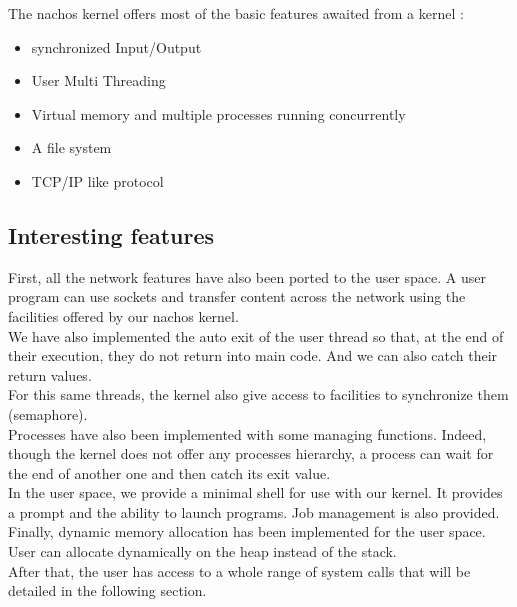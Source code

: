 The nachos kernel offers most of the basic features awaited from a kernel :\\
\begin{itemize}
\item synchronized Input/Output
\item User Multi Threading
\item Virtual memory and multiple processes running concurrently
\item A file system
\item TCP/IP like protocol
\end{itemize}

\subsection{Interesting features}

First, all the network features have also been ported to the user space. A user program can use sockets and 
transfer content across the network using the facilities offered by our nachos kernel. \\
We have also implemented the auto exit of the user thread so that, at the end of their execution, they do not return
into main code. And we can also catch their return values.\\
For this same threads, the kernel also give access to facilities to synchronize them (semaphore).\\
Processes have also been implemented with some managing functions. Indeed, though the kernel does not offer any 
processes hierarchy, a process can wait for the end of another one and then catch its exit value.\\
In the user space, we provide a minimal shell for use with our kernel. It provides a prompt and the ability
to launch programs. Job management is also provided.\\
Finally, dynamic memory allocation has been implemented for the user space. User can allocate dynamically on the heap 
instead of the stack.\\
After that, the user has access to a whole range of system calls that will be detailed in the following section.
